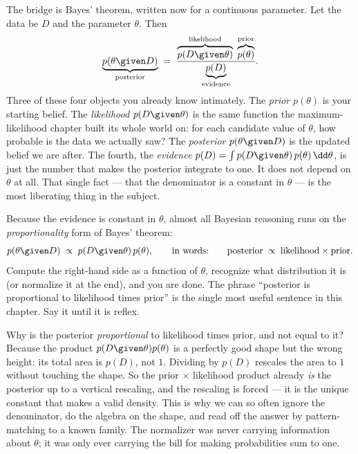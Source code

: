 The bridge is Bayes' theorem, written now for a continuous parameter. Let the data be $D$
and the parameter $\theta$. Then
\begin{equation}
  \underbrace{p(\theta \given D)}_{\text{posterior}}
  \;=\;
  \frac{\overbrace{p(D \given \theta)}^{\text{likelihood}}\;\overbrace{p(\theta)}^{\text{prior}}}
       {\underbrace{p(D)}_{\text{evidence}}}.
  \label{ch31:bayes-continuous}
\end{equation}
Three of these four objects you already know intimately. The \emph{prior} $p(\theta)$ is
your starting belief. The \emph{likelihood} $p(D \given \theta)$ is the same function the
maximum-likelihood chapter built its whole world on: for each candidate value of $\theta$,
how probable is the data we actually saw? The \emph{posterior} $p(\theta \given D)$ is the
updated belief we are after. The fourth, the \emph{evidence} $p(D) = \int p(D \given
\theta)\, p(\theta)\, \dd\theta$, is just the number that makes the posterior integrate to
one. It does not depend on $\theta$ at all. That single fact --- that the denominator is a
constant in $\theta$ --- is the most liberating thing in the subject.

\begin{focusbox}
Because the evidence is constant in $\theta$, almost all Bayesian reasoning runs on the
\emph{proportionality} form of Bayes' theorem:
\[
  p(\theta \given D)\;\propto\; p(D \given \theta)\, p(\theta),
  \qquad\text{in words:}\qquad
  \text{posterior} \;\propto\; \text{likelihood} \times \text{prior}.
\]
Compute the right-hand side as a function of $\theta$, recognize what distribution it is
(or normalize it at the end), and you are done. The phrase ``posterior is proportional to
likelihood times prior'' is the single most useful sentence in this chapter. Say it until
it is reflex.
\end{focusbox}

\begin{whybox}
Why is the posterior \emph{proportional} to likelihood times prior, and not equal to it?
Because the product $p(D\given\theta)p(\theta)$ is a perfectly good shape but the wrong
height: its total area is $p(D)$, not $1$. Dividing by $p(D)$ rescales the area to $1$
without touching the shape. So the prior$\,\times\,$likelihood product already \emph{is}
the posterior up to a vertical rescaling, and the rescaling is forced --- it is the unique
constant that makes a valid density. This is why we can so often ignore the denominator,
do the algebra on the shape, and read off the answer by pattern-matching to a known
family. The normalizer was never carrying information about $\theta$; it was only ever
carrying the bill for making probabilities sum to one.
\end{whybox}

